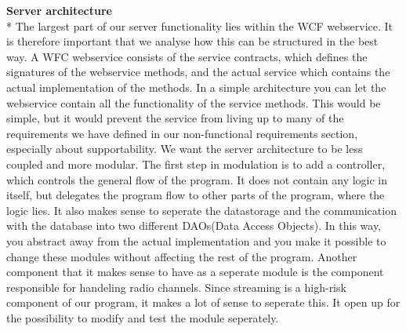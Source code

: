 \documentclass[a4paper,11pt,report]{article}
\begin{document}
\textbf{Server architecture} \\*
The largest part of our server functionality lies within the WCF webservice. It is therefore important that we analyse how this can be structured in the best way.
A WFC webservice consists of the service contracts, which defines the signatures of the webservice methods, and the actual service which contains the actual implementation of the methods. In a simple architecture you can let the webservice contain all the functionality of the service methods. This would be simple, but it would prevent the service from living up to many of the requirements we have defined in our non-functional requirements section, especially about supportability. We want the server architecture to be less coupled and more modular. The first step in modulation is to add a controller, which controls the general flow of the program. It does not contain any logic in itself, but delegates the program flow to other parts of the program, where the logic lies. It also makes sense to seperate the datastorage and the communication with the database into two different DAOs(Data Access Objects). In this way, you abstract away from the actual implementation and you make it possible to change these modules without affecting the rest of the program. Another component that it makes sense to have as a seperate module is the component responsible for handeling radio channels. Since streaming is a high-risk component of our program, it makes a lot of sense to seperate this. It open up for the possibility to modify and test the module seperately. 
\end{document}
